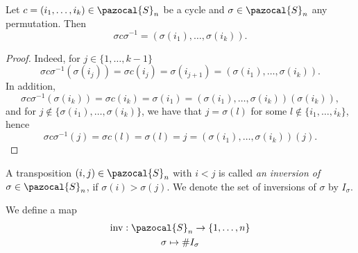 \begin{lemma}
    Let $c=(i_1,\dots,i_k)\in \pazocal{S}_n$ be a cycle and $\sigma\in\pazocal{S}_n$ any permutation. Then 
    $$
        \sigma c \sigma^{-1}=(\sigma(i_1),\dots,\sigma(i_k)).
    $$ 
\end{lemma}
\begin{proof}
    Indeed, for $j\in\{1,\dots,k-1\}$
    $$
        \sigma c\sigma^{-1}(\sigma(i_j))=\sigma c(i_j)=\sigma(i_{j+1})=(\sigma(i_1),\dots,\sigma(i_k)).
    $$
    In addition,
    $$
        \sigma c\sigma^{-1}(\sigma(i_k))=\sigma c(i_k)=\sigma(i_1)=(\sigma(i_1),\dots,\sigma(i_k))(\sigma(i_k)),
    $$
    and for $j\notin \{\sigma(i_1),\dots,\sigma(i_k)\}$, we have that $j=\sigma(l)$ for some $l\notin\{i_1,\dots,i_k\}$, hence 
    $$
        \sigma c\sigma^{-1}(j)=\sigma c(l)=\sigma(l)=j = (\sigma(i_1),\dots,\sigma(i_k))(j).
    $$
\end{proof}
\begin{definition}
    A transposition $(i,j)\in \pazocal{S}_n$ with $i<j$ is called \emph{an inversion of $\sigma\in\pazocal{S}_n$}, if $\sigma(i)>\sigma(j)$. We denote the set of inversions of $\sigma$ by $I_\sigma$.  
\end{definition}
We define a map 
\begin{gather*}
    \mathrm{inv} : \pazocal{S}_n \rightarrow \{1,\dots,n\}\\
    \sigma \mapsto \#I_\sigma
\end{gather*}

